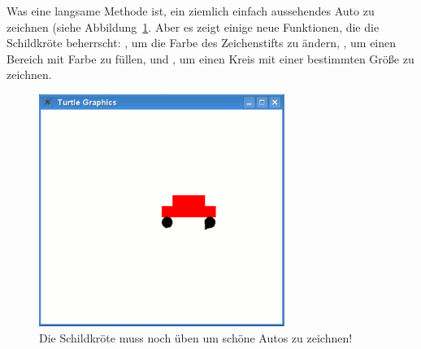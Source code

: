 \noindent
Was eine langsame Methode ist, ein ziemlich einfach aussehendes Auto zu zeichnen (siehe Abbildung~\ref{fig24}. Aber es zeigt einige neue Funktionen, die die Schildkröte beherrscht: , um die Farbe des Zeichenstifts zu ändern, , um einen Bereich mit Farbe zu füllen, und , um einen Kreis mit einer bestimmten Größe zu zeichnen.

\begin{figure}
\begin{center}
\includegraphics[width=80mm]{images/figure24}
\end{center}
\caption{Die Schildkröte muss noch üben um schöne Autos zu zeichnen!}\label{fig24}
\end{figure}

